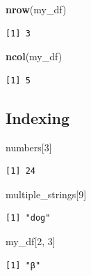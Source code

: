 \documentclass[]{book}
\newenvironment{Shaded}{\begin{snugshade}}{\end{snugshade}}
\newcommand{\KeywordTok}[1]{\textcolor[rgb]{0.13,0.29,0.53}{\textbf{#1}}}
\newcommand{\DecValTok}[1]{\textcolor[rgb]{0.00,0.00,0.81}{#1}}
\newcommand{\NormalTok}[1]{#1}
\theoremstyle{definition}
\theoremstyle{definition}
\theoremstyle{definition}
\theoremstyle{remark}
\begin{document}
\begin{Shaded}
\begin{Highlighting}[]
\KeywordTok{nrow}\NormalTok{(my_df)}
\end{Highlighting}
\end{Shaded}

\begin{verbatim}
[1] 3
\end{verbatim}

\begin{Shaded}
\begin{Highlighting}[]
\KeywordTok{ncol}\NormalTok{(my_df)}
\end{Highlighting}
\end{Shaded}

\begin{verbatim}
[1] 5
\end{verbatim}

\subsection{Indexing}\label{indexing}

\begin{Shaded}
\begin{Highlighting}[]
\NormalTok{numbers[}\DecValTok{3}\NormalTok{]}
\end{Highlighting}
\end{Shaded}

\begin{verbatim}
[1] 24
\end{verbatim}

\begin{Shaded}
\begin{Highlighting}[]
\NormalTok{multiple_strings[}\DecValTok{9}\NormalTok{]}
\end{Highlighting}
\end{Shaded}

\begin{verbatim}
[1] "dog"
\end{verbatim}

\begin{Shaded}
\begin{Highlighting}[]
\NormalTok{my_df[}\DecValTok{2}\NormalTok{, }\DecValTok{3}\NormalTok{]}
\end{Highlighting}
\end{Shaded}

\begin{verbatim}
[1] "β"
\end{verbatim}
\end{document}
